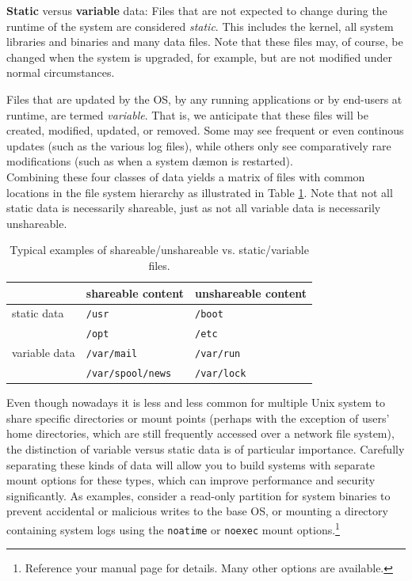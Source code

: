 {\bf Static} versus {\bf variable} data:  Files that
are not expected to change during the runtime of the
system are considered {\em static}.  This includes the
kernel, all system libraries and binaries and many
data files.  Note that these files may, of course, be
changed when the system is upgraded, for example, but
are not modified under normal circumstances.

Files that are updated by the OS, by any running
applications or by end-users at runtime, are termed
{\em variable}.  That is, we anticipate that these
files will be created, modified, updated, or removed.
Some may see frequent or even continous updates (such
as the various log files), while others only see
comparatively rare modifications (such as when a
system d\ae mon is restarted).  \\

Combining these four classes of data yields a matrix
of files with common locations in the file system
hierarchy as illustrated in Table
\ref{table:software-installation:shareable-variable}.
Note that not all static data is necessarily
shareable, just as not all variable data is
necessarily unshareable.

\begin{table}[b]
\centering
	\begin{tabular}{ l l l }
	& shareable content & unshareable content \\
	\hline
	static data & {\tt /usr} & {\tt /boot} \\
	& {\tt /opt} & {\tt /etc} \\
	\hline
	variable data & {\tt /var/mail} & {\tt /var/run} \\
	& {\tt /var/spool/news} & {\tt /var/lock} \\
	\hline
	\end{tabular}
	\caption[Shareable/unshareable vs. static/variable files]{Typical
		examples of shareable/unshareable vs. static/variable files.}
	\label{table:software-installation:shareable-variable}
\end{table}

Even though nowadays it is less and less common for
multiple Unix system to share specific directories or
mount points (perhaps with the exception of users'
home directories, which are still frequently accessed
over a network file system), the distinction of
variable versus static data is of particular
importance.  Carefully separating these kinds of data
will allow you to build systems with separate mount
options for these types, which can improve performance
and security significantly.  As examples, consider a
read-only partition for system binaries to prevent
accidental or malicious writes to the base OS, or
mounting a directory containing system logs using the
{\tt noatime} or {\tt noexec} mount
options.\footnote{Reference your  manual
page for details.  Many other options are available.}

